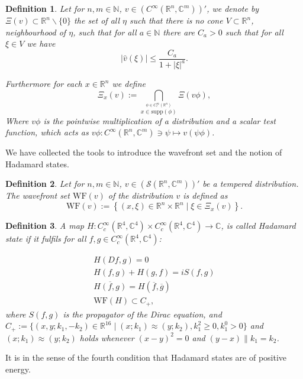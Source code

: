 \documentclass[a4paper,11pt]{article}
\newtheorem{de}{Definition}
\begin{document}
\begin{de}
Let for \(n,m\in\mathbb{N}\),  \(v\in (C^\infty(\mathbb{R}^n,\mathbb{C}^m))'\), we denote by \(\Xi(v)\subset \mathbb{R}^n\backslash\{0\}\) the set of all \(\eta\) such that there is no
cone \(V\subset \mathbb{R}^n\), neighbourhood of \(\eta\), such that for all \(a\in\mathbb{N}\) there are \(C_a>0\) such that for all \(\xi\in V\) we have
\begin{equation}
|\hat{v}(\xi)|\le \frac{C_a}{1+|\xi|^a}.
\end{equation}

Furthermore for each \(x\in \mathbb{R}^n\) we define 
\begin{equation}
\Xi_x (v) := \bigcap_{\overset{\phi \in C^\infty_c (\mathbb{R}^n)}{x\in \mathrm{supp}(\phi)}} \Xi(v \phi),
\end{equation}
Where \(v\phi\) is the pointwise multiplication of a distribution and a scalar test function, which acts as \(v\phi: C^\infty(\mathbb{R}^n,\mathbb{C}^m)\ni \psi\mapsto v(\psi \phi)\). 
\end{de}

We have collected the tools to introduce the wavefront set and the notion of Hadamard states.

\begin{de}
Let for \(n,m\in\mathbb{N}\), \(v\in (\mathcal{S}(\mathbb{R}^n,\mathbb{C}^m))'\) be a tempered distribution. The wavefront set \(\mathrm{WF}(v)\) of 
the distribution \(v\) is defined as 
\begin{equation}
\mathrm{WF}(v):= \left\{(x,\xi)\in \mathbb{R}^n\times \mathbb{R}^n\mid \xi \in \Xi_x(v) \right\}.
\end{equation}
\end{de}

\begin{de}\label{def: hadamard}
A map \(H: C_c^\infty(\mathbb{R}^4,\mathbb{C}^4)\times C_c^\infty(\mathbb{R}^4,\mathbb{C}^4) \rightarrow \mathbb{C}\), is called Hadamard state if it fulfils
for all \( f,g\in C_c^\infty(\mathbb{R}^4,\mathbb{C}^4)\):

\begin{align}
H(Df,g)=0\\
H(f,g)+H(g,f)=i S(f,g)\\
\overline{H(f,g)}=H(\overline{f},\overline{g})\\
\text{WF}(H)\subset C_+,
\end{align}
where \(S(f,g)\) is the propagator of the Dirac equation, 
 and  \(C_+:=\{(x,y;k_1,-k_2)\in\mathbb{R}^{16}\mid (x;k_1)\approx (y;k_2) , k_1^2\ge0, k_1^0>0\}\)
and \((x;k_1)\approx(y;k_2)\) holds whenever \((x-y)^2=0\) and \((y-x)\parallel k_1 = k_2\).
\end{de}
It is in the sense of the fourth condition that Hadamard states are of positive energy.
\end{document}
